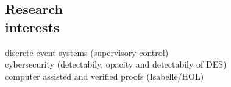 \documentclass[margin]{res}
\newcommand{\fullhrulefill}{%
  \hspace*{-\sectionwidth}\hrulefill%
  }
\def\theyear{#2#3#4#5}%
\def\themonth{#6#7}%
\def\theday{#8#9}%
\def\thehour{#1#2}%
\def\theminute{#3#4}%
\def\thesecond{#5#6}%
\def\thetimezonehour{+00}%
\def\thetimezoneminute{00}%
\def\thetimezonehour{#1}%
\def\thetimezoneminute{#2}%
\newcommand*{\thetimezone}{\thetimezonehour:\thetimezoneminute}
\begin{document}
\begin{resume}

\fullhrulefill







\section{Research\\interests}
discrete-event systems (supervisory control) \\
cybersecurity (detectabily, opacity and detectabily of DES) \\
computer assisted and verified proofs (Isabelle/HOL)


\end{resume}
\end{document}

